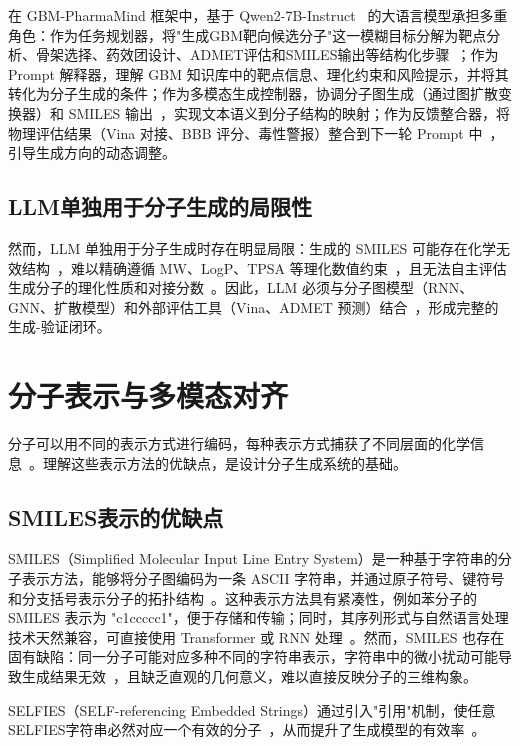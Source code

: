 在 GBM-PharmaMind 框架中，基于 Qwen2-7B-Instruct~\cite{Qwen2Team2024} 的大语言模型承担多重角色：作为任务规划器，将"生成GBM靶向候选分子"这一模糊目标分解为靶点分析、骨架选择、药效团设计、ADMET评估和SMILES输出等结构化步骤~\cite{Wei2022}；作为 Prompt 解释器，理解 GBM 知识库中的靶点信息、理化约束和风险提示，并将其转化为分子生成的条件；作为多模态生成控制器，协调分子图生成（通过图扩散变换器）和 SMILES 输出~\cite{liu2025multimodal}，实现文本语义到分子结构的映射；作为反馈整合器，将物理评估结果（Vina 对接、BBB 评分、毒性警报）整合到下一轮 Prompt 中~\cite{Yao2023}，引导生成方向的动态调整。

\subsection{LLM单独用于分子生成的局限性}

然而，LLM 单独用于分子生成时存在明显局限：生成的 SMILES 可能存在化学无效结构~\cite{Bagal2021}，难以精确遵循 MW、LogP、TPSA 等理化数值约束~\cite{Pardridge2012}，且无法自主评估生成分子的理化性质和对接分数~\cite{Trott2010}。因此，LLM 必须与分子图模型（RNN、GNN、扩散模型）和外部评估工具（Vina、ADMET 预测）结合~\cite{Li2025DrugPilot}，形成完整的生成-验证闭环。

\section{分子表示与多模态对齐}\label{sec:molecular-representation}

分子可以用不同的表示方式进行编码，每种表示方式捕获了不同层面的化学信息~\cite{Gilmer2017}。理解这些表示方法的优缺点，是设计分子生成系统的基础。

\subsection{SMILES表示的优缺点}

SMILES（Simplified Molecular Input Line Entry System）是一种基于字符串的分子表示方法，能够将分子图编码为一条 ASCII 字符串，并通过原子符号、键符号和分支括号表示分子的拓扑结构~\cite{Weininger1988}。这种表示方法具有紧凑性，例如苯分子的 SMILES 表示为 "c1ccccc1"，便于存储和传输；同时，其序列形式与自然语言处理技术天然兼容，可直接使用 Transformer 或 RNN 处理~\cite{Bagal2021}。然而，SMILES 也存在固有缺陷：同一分子可能对应多种不同的字符串表示，字符串中的微小扰动可能导致生成结果无效~\cite{Bagal2021}，且缺乏直观的几何意义，难以直接反映分子的三维构象。

SELFIES（SELF-referencing Embedded Strings）通过引入"引用"机制，使任意SELFIES字符串必然对应一个有效的分子~\cite{KrenNips2020}，从而提升了生成模型的有效率~\cite{KrenNips2020}。

